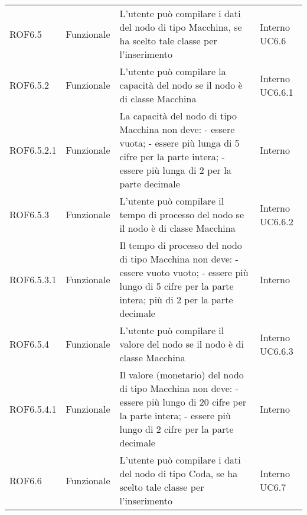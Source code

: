 \begin{longtable}{p{2cm}!{\VRule[1pt]}p{2cm}!{\VRule[1pt]}p{5cm}!{\VRule[1pt]}p{1.5cm}}
	\\
	ROF6.5                           & Funzionale\newline               & L'utente può compilare i dati del nodo di tipo Macchina, se ha scelto tale classe per l'inserimento                      & Interno \newline UC6.6       
	\\
	ROF6.5.2                         & Funzionale\newline               & L'utente può compilare la capacità  del nodo se il nodo è di classe Macchina                                           & Interno \newline UC6.6.1     
	\\
	ROF6.5.2.1&Funzionale\newline  & La capacità del nodo di tipo Macchina non deve:
	- essere vuota;
	- essere più lunga di 5 cifre per la parte intera;
	- essere più lunga di 2 per la parte decimale & Interno \\
	ROF6.5.3                         & Funzionale\newline               & L'utente può compilare il tempo di processo del nodo se il nodo è di classe Macchina                                    & Interno \newline UC6.6.2     
	\\
	ROF6.5.3.1&Funzionale\newline  & Il tempo di processo del nodo di tipo Macchina non deve:
	- essere vuoto vuoto;
	- essere più lungo di 5 cifre per la parte intera; più di 2 per la parte decimale & Interno \\
	ROF6.5.4                         & Funzionale\newline               & L'utente può compilare il valore del nodo se il nodo è di classe Macchina                                               & Interno \newline UC6.6.3     
	\\
	ROF6.5.4.1&Funzionale\newline  & Il valore (monetario) del nodo di tipo Macchina non deve:
	- essere più lungo di 20 cifre per la parte intera;
	- essere  più lungo di 2 cifre per la parte decimale & Interno \\
	ROF6.6                           & Funzionale\newline               & L'utente può compilare i dati del nodo di tipo Coda, se ha scelto tale classe per l'inserimento                          & Interno \newline UC6.7       

\end{longtable}
